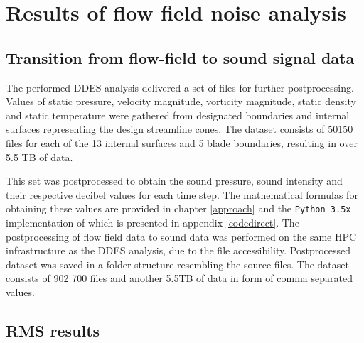 
\chapter{Results of flow field noise analysis} %

\label{results} %



\section{Transition from flow-field to sound signal data}

The performed DDES analysis delivered a set of files for further postprocessing. Values of static pressure, velocity magnitude, vorticity magnitude, static density and static temperature were gathered from designated boundaries and internal surfaces representing the design streamline cones. The dataset consists of 50150 files for each of the 13 internal surfaces and 5 blade boundaries, resulting in over 5.5 TB of data.

This set was postprocessed to obtain the sound pressure, sound intensity and their respective decibel values for each time step. The mathematical formulas for obtaining these values are provided in chapter \ref{approach} and the \texttt{Python 3.5x} implementation of which is presented in appendix \ref{codedirect}. The postprocessing of flow field data to sound data was performed on the same HPC infrastructure as the DDES analysis, due to the file accessibility. Postprocessed dataset was saved in a folder structure resembling the source files. The dataset consists of 902 700 files and another 5.5TB of data in form of comma separated values.

\section{RMS results} \label{rms}

